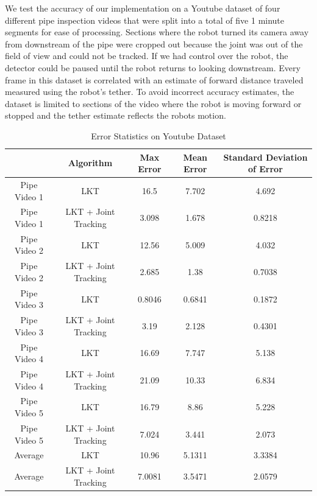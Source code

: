 \documentclass[letterpaper, 10 pt, conference]{ieeeconf}
\begin{document}
We test the accuracy of our implementation on a Youtube dataset of four different pipe inspection videos that were split into a total of five 1 minute segments for ease of processing. Sections where the robot turned its camera away from downstream of the pipe were cropped out because the joint was out of the field of view and could not be tracked. If we had control over the robot, the detector could be paused until the robot returns to looking downstream. Every frame in this dataset is correlated with an estimate of forward distance traveled measured using the robot's tether. To avoid incorrect accuracy estimates, the dataset is limited to sections of the video where the robot is moving forward or stopped and the tether estimate reflects the robots motion.

\begin{table}[tb] 
	\centering
	\footnotesize
	\setlength{\tabcolsep}{.5em}
	\caption{Error Statistics on Youtube Dataset}
	\label{table:youtube_results}
	\begin{tabular}{c|c|c|c|c|}
		\hline
		& Algorithm & Max Error & Mean Error & Standard Deviation of Error\\
		\hline
		Pipe Video 1 & LKT & 16.5 & 7.702 & 4.692 \\
		\rowcolor{Gray}
		Pipe Video 1 & LKT + Joint Tracking & 3.098 & 1.678 & 0.8218\\
		Pipe Video 2 & LKT & 12.56 & 5.009 & 4.032\\
		\rowcolor{Gray}
		Pipe Video 2 & LKT + Joint Tracking & 2.685 & 1.38 & 0.7038\\
		Pipe Video 3 & LKT & 0.8046 & 0.6841 & 0.1872 \\
		\rowcolor{Gray}
		Pipe Video 3 & LKT + Joint Tracking & 3.19 & 2.128 & 0.4301\\
		Pipe Video 4 & LKT & 16.69 & 7.747 & 5.138\\
		\rowcolor{Gray}
		Pipe Video 4 & LKT + Joint Tracking & 21.09 & 10.33 & 6.834\\
		Pipe Video 5 & LKT & 16.79 & 8.86 & 5.228 \\
		\rowcolor{Gray}
		Pipe Video 5 & LKT + Joint Tracking & 7.024 & 3.441 & 2.073\\
		\hline
		\hline
		Average  & LKT & 10.96 & 5.1311 & 3.3384 \\
		\rowcolor{Gray}
		Average & LKT + Joint Tracking & 7.0081 & 3.5471 & 2.0579\\
		\hline
	\end{tabular}
\end{table}
\end{document}
